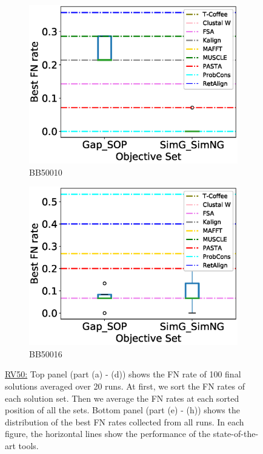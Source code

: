 \begin{figure}[!htbp]
\begin{adjustwidth}{-1.5cm}{-1cm}
\begin{subfigure}{0.22\textwidth}
			\includegraphics[width=\columnwidth]{Figure/summary/precomputedInit/Balibase/BB50010_objset_fnrate_rank}
			\caption{BB50010}
		\end{subfigure}
		\begin{subfigure}{0.22\textwidth}
			\includegraphics[width=\columnwidth]{Figure/summary/precomputedInit/Balibase/BB50016_objset_fnrate_rank}
			\caption{BB50016}
		\end{subfigure}
		\end{adjustwidth}
		\caption[FN rate results on RV50]{\underline{RV50:} Top panel (part (a) - (d)) shows the FN rate of 100 final solutions averaged over 20 runs. At first, we sort the FN rates of each solution set. Then we average the FN rates at each sorted position of all the sets. Bottom panel (part (e) - (h)) shows the distribution of the best FN rates collected from all runs. In each figure, the horizontal lines show the performance of the state-of-the-art tools.}
		\label{fig:rv50_fn_rate}

\end{figure}


